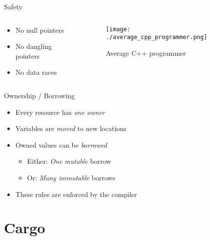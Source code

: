 \documentclass[aspectratio=1610,t]{beamer}
\begin{document}
\begin{frame}[c]{Safety}
  \begin{columns}[onlytextwidth]
    \begin{column}{.3\textwidth}
      \begin{itemize}
        \item No null pointers
        \item No dangling pointers
        \item No data races
      \end{itemize}
    \end{column}
    \begin{column}{.7\textwidth}
      \begin{figure}
        \texttt{[image: ./average\_cpp\_programmer.png]}
        \caption{Average C++ programmer}
      \end{figure}
    \end{column}
  \end{columns}
\end{frame}


\begin{frame}[c]{Ownership / Borrowing}
  \begin{itemize}
    \item Every resource has \emph{one owner}
    \item Variables are \emph{moved} to new locations
    \item Owned values can be \emph{borrowed}
      \begin{itemize}
        \item{Either: \emph{One mutable} borrow}
        \item{Or: \emph{Many immutable} borrows}
      \end{itemize}
    \item These rules are enforced by the compiler
  \end{itemize}
\end{frame}

\section{Cargo}
\end{document}
